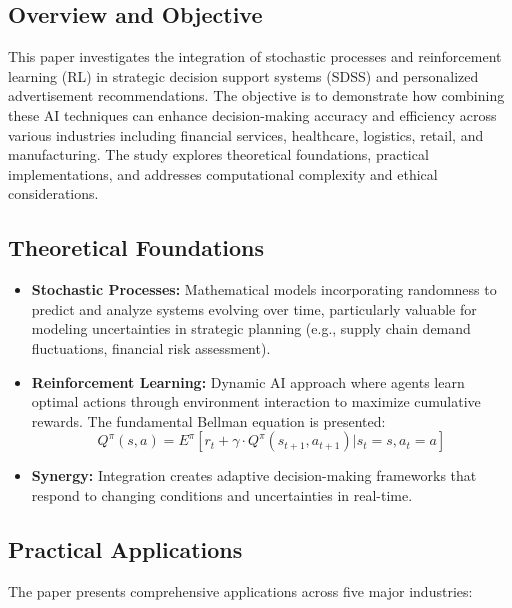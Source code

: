 \subsection*{Overview and Objective}
This paper investigates the integration of stochastic processes and reinforcement learning (RL) in strategic decision support systems (SDSS) and personalized advertisement recommendations. The objective is to demonstrate how combining these AI techniques can enhance decision-making accuracy and efficiency across various industries including financial services, healthcare, logistics, retail, and manufacturing. The study explores theoretical foundations, practical implementations, and addresses computational complexity and ethical considerations.

\subsection*{Theoretical Foundations}
\begin{itemize}
    \item \textbf{Stochastic Processes:} Mathematical models incorporating randomness to predict and analyze systems evolving over time, particularly valuable for modeling uncertainties in strategic planning (e.g., supply chain demand fluctuations, financial risk assessment).
    \item \textbf{Reinforcement Learning:} Dynamic AI approach where agents learn optimal actions through environment interaction to maximize cumulative rewards. The fundamental Bellman equation is presented:
    \begin{equation}
        Q^{\pi}(s,a) = E^{\pi}[r_t + \gamma \cdot Q^{\pi}(s_{t+1}, a_{t+1})|s_t = s, a_t = a]
    \end{equation}
    \item \textbf{Synergy:} Integration creates adaptive decision-making frameworks that respond to changing conditions and uncertainties in real-time.
\end{itemize}

\subsection*{Practical Applications}
The paper presents comprehensive applications across five major industries:

